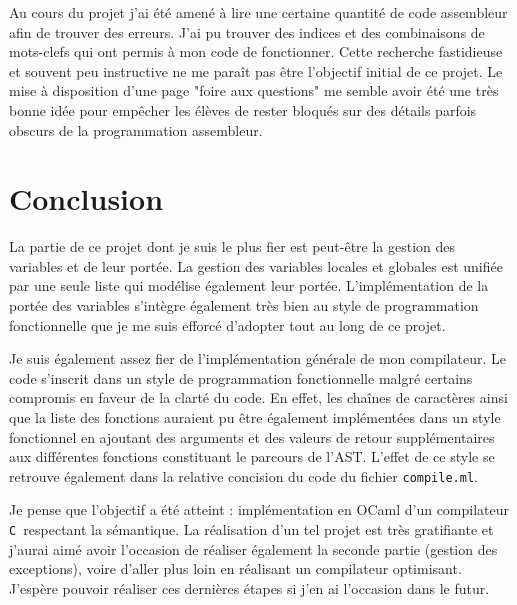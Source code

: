 \documentclass[11pt]{article}
\newcommand{\Cmm}{\texttt{C\textminus\textminus\ }}
\newcommand{\ttt}[1]{\texttt{#1}}
\begin{document}
Au cours du projet j'ai été amené à lire une certaine quantité de code assembleur afin de trouver des erreurs.
J'ai pu trouver des indices et des combinaisons de mots-clefs qui ont permis à mon code de fonctionner.
Cette recherche fastidieuse et souvent peu instructive ne me paraît pas être l'objectif initial de ce projet.
Le mise à disposition d'une page "foire aux questions" me semble avoir été une très bonne idée pour empêcher les élèves de rester bloqués sur des détails parfois obscurs de la programmation assembleur.

\section{Conclusion}
La partie de ce projet dont je suis le plus fier est peut-être la gestion des variables et de leur portée.
La gestion des variables locales et globales est unifiée par une seule liste qui modélise également leur portée.
L'implémentation de la portée des variables s'intègre également très bien au style de programmation fonctionnelle que je me suis efforcé d'adopter tout au long de ce projet.

Je suis également assez fier de l'implémentation générale de mon compilateur.
Le code s'inscrit dans un style de programmation fonctionnelle malgré certains compromis en faveur de la clarté du code.
En effet, les chaînes de caractères ainsi que la liste des fonctions auraient pu être également implémentées dans un style fonctionnel en ajoutant des arguments et des valeurs de retour supplémentaires aux différentes fonctions constituant le parcours de l'AST.
L'effet de ce style se retrouve également dans la relative concision du code du fichier \ttt{compile.ml}.

Je pense que l'objectif a été atteint : implémentation en OCaml d'un compilateur \Cmm respectant la sémantique.
La réalisation d'un tel projet est très gratifiante et j'aurai aimé avoir l'occasion de réaliser également la seconde partie (gestion des exceptions), voire d'aller plus loin en réalisant un compilateur optimisant.
J'espère pouvoir réaliser ces dernières étapes si j'en ai l'occasion dans le futur.
\end{document}
